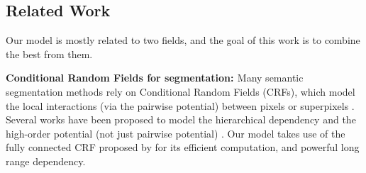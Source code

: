 \subsection{Related Work}
Our model is mostly related to two fields, and the goal of this work is to combine the best from them.

{\bf{Conditional Random Fields for segmentation: }} Many semantic segmentation methods rely on Conditional Random Fields (CRFs), which model the local interactions (via the pairwise potential) between pixels \citep{rother2004grabcut, shotton2009textonboost} or superpixels \citep{lucchi2011spatial}. Several works have been proposed to model the hierarchical dependency \citep{he2004multiscale, ladicky2009associative, lempitsky2011pylon} and the high-order potential (not just pairwise potential) \citep{delong2012fast, gonfaus2010harmony, kohli2009robust, krahenbuhl2011efficient}. Our model takes use of the fully connected CRF proposed by \citet{krahenbuhl2011efficient} for its efficient computation, and powerful long range dependency.

